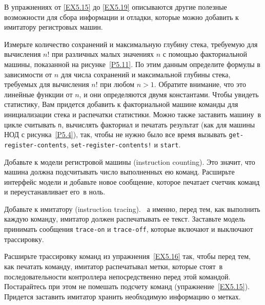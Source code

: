 В упражнениях от \ref{EX5.15} до 
\ref{EX5.19} описываются другие полезные возможности для
сбора информации и отладки, которые можно добавить к имитатору
регистровых машин.
\begin{exercise}{5.14}%
\label{EX5.14}%
Измерьте количество сохранений и максимальную глубину
стека, требуемую для вычисления $n!$ при различных малых
значениях $n$ с помощью факториальной машины, показанной на
рисунке~\ref{P5.11}.  
По этим данным определите формулы в
зависимости от $n$ для числа сохранений и максимальной
глубины стека, требуемых для вычисления $n!$ при любом
$n > 1$.  Обратите внимание, что это линейные функции от
$n$, и они определяются двумя константами.  Чтобы
увидеть статистику, Вам придется добавить к факториальной машине
команды для инициализации стека и распечатки статистики.  Можно также
заставить машину~в цикле считывать {\tt n}, вычислять факториал
и печатать результат (как для машины НОД с 
рисунка~\ref{P5.4}), так, чтобы не нужно было все время вызывать
{\tt get-register-contents},
{\tt set-register-contents!} и {\tt start}.
\end{exercise}
\begin{exercise}{5.15}%
\label{EX5.15}%
Добавьте к модели регистровой машины 
 (instruction counting).  Это значит, что
машина должна подсчитывать число выполненных ею команд.  Расширьте
интерфейс модели и добавьте новое сообщение, которое печатает счетчик
команд и переустанавливает его~в ноль.
\end{exercise}
\begin{exercise}{5.16}%
\label{EX5.16}%
Добавьте к имитатору 
 (instruction tracing). ~а именно, перед тем, как выполнить каждую команду,
имитатор должен распечатывать ее текст.  Заставьте модель принимать
сообщения {\tt trace-on} и {\tt trace-off}, которые
включают и выключают трассировку.
\end{exercise}
\begin{exercise}{5.17}%
\label{EX5.17}%
Расширьте трассировку команд из 
упражнения~\ref{EX5.16} так, чтобы перед тем, как печатать команду,
имитатор распечатывал метки, которые стоят~в последовательности
контроллера непосредственно перед этой командой.  Постарайтесь при
этом не помешать подсчету команд 
(упражнение~\ref{EX5.15}).  Придется заставить имитатор
хранить необходимую информацию о метках. 
\end{exercise}
